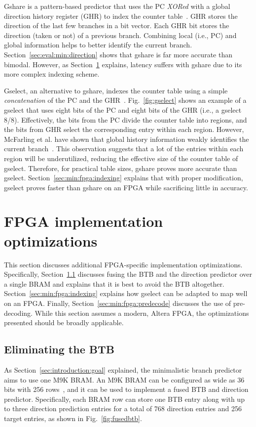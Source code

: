 Gshare is a pattern-based predictor that uses the PC \textit{XORed} with a global direction history register (GHR) to index the counter table~\cite{McFarling}. GHR stores the direction of the last few branches in a bit vector. Each GHR bit stores the direction (taken or not) of a previous branch. Combining local (i.e., PC) and global information helps to better identify the current branch. Section~\ref{sec:eval:min:direction} shows that gshare is far more accurate than bimodal. However, as Section~\ref{sec:min:fpga} explains, latency suffers with gshare due to its more complex indexing scheme.

Gselect, an alternative to gshare, indexes the counter table using a simple \textit{concatenation} of the PC and the GHR~\cite{McFarling}. Fig.~\ref{fig:gselect} shows an example of a gselect that uses eight bits of the PC and eight bits of the GHR (i.e., a gselect 8/8). Effectively, the bits from the PC divide the counter table into regions, and the bits from GHR select the corresponding entry within each region. However, McFarling et al. have shown that global history information weakly identifies the current branch~\cite{McFarling}. This observation suggests that a lot of the entries within each region will be underutilized, reducing the effective size of the counter table of gselect. Therefore, for practical table sizes, gshare proves more accurate than gselect. Section~\ref{sec:min:fpga:indexing} explains that with proper modification, gselect proves faster than gshare on an FPGA while sacrificing little in accuracy.

\section{FPGA implementation optimizations}
\label{sec:min:fpga}
This section discusses additional FPGA-specific implementation optimizations. Specifically, Section~\ref{sec:min:fpga:nobtb} discusses fusing the BTB and the direction predictor over a single BRAM and explains that it is best to avoid the BTB altogether. Section~\ref{sec:min:fpga:indexing} explains how gselect can be adapted to map well on an FPGA. Finally, Section~\ref{sec:min:fpga:predecode} discusses the use of pre-decoding. While this section assumes a modern, Altera FPGA, the optimizations presented should be broadly applicable.

\subsection{Eliminating the BTB}
\label{sec:min:fpga:nobtb}
As Section~\ref{sec:introduction:goal} explained, the minimalistic branch predictor aims to use one M9K BRAM. An M9K BRAM can be configured as wide as 36 bits with 256 rows~\cite{StratixIVM9K}, and it can be used to implement a fused BTB and direction predictor. Specifically, each BRAM row can store one BTB entry along with up to three direction prediction entries for a total of 768 direction entries and 256 target entries, as shown in Fig.~\ref{fig:fusedbtb}.

